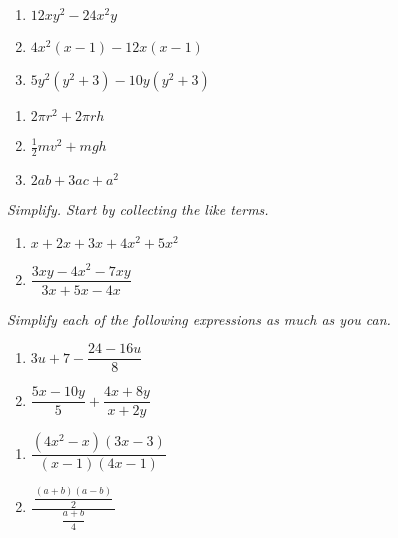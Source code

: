 \documentclass[11pt]{article}
\newcommand{\ds}{\displaystyle}
\begin{document}
\begin{multicols}{3}
\begin{enumerate}
\setcounter{enumi}{\theenumCount}
\item $12xy^2 - 24 x^2 y$ 
\item $4x^2(x-1) - 12x(x-1)$ 
\item $5y^2(y^2+3)-10y(y^2+3)$ 
\setcounter{enumCount}{\theenumi}
\end{enumerate}
\end{multicols}
\vfill


\begin{multicols}{3}
\begin{enumerate}
\setcounter{enumi}{\theenumCount}
\item $2\pi r^2 + 2 \pi r h$ 
\item $\tfrac{1}{2} m v^2 + m g h$ 
\item $2ab + 3ac + a^2$ 
\setcounter{enumCount}{\theenumi}
\end{enumerate}
\end{multicols}
\vfill


\newpage
\noindent
\textit{Simplify. Start by collecting the like terms. }
\begin{multicols}{2}
\begin{enumerate}
\setcounter{enumi}{\theenumCount}
\item $x + 2x + 3x + 4x^2 + 5x^2$
\item $\dfrac{3xy - 4x^2 - 7xy}{3x + 5x - 4x}$
\setcounter{enumCount}{\theenumi}
\end{enumerate}
\end{multicols}
\vfill



\noindent
\textit{Simplify each of the following expressions as much as you can. }
\begin{multicols}{2}
\begin{enumerate}
\setcounter{enumi}{\theenumCount}
\item $3u+7 - \dfrac{24-16u}{8}$
\item $\dfrac{5x - 10y}{5} + \dfrac{4x+8y}{x+2y}$ 
\setcounter{enumCount}{\theenumi}
\end{enumerate}
\end{multicols}
\vfill

\begin{multicols}{2}
\begin{enumerate}
\setcounter{enumi}{\theenumCount}
\item $\dfrac{(4x^2-x)(3x-3)}{(x-1)(4x-1)}$
\item $\ds \frac{~\dfrac{(a+b)(a - b)}{2}~}{\dfrac{a+b}{4}}$
\setcounter{enumCount}{\theenumi}
\end{enumerate}
\end{multicols}
\vfill
\end{document}

